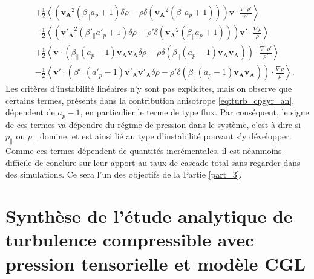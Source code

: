 \begin{equation}
{\begin{array}{lcl}
&& + \frac{1}{2} \left<  \left(  \boldsymbol{v_A}^2 \left(\beta_{\parallel}a_p+1\right) \delta \rho - \rho \delta \left(\boldsymbol{v_A}^2 \left(\beta_{\parallel}a_p+1\right)\right)  \right)\boldsymbol{v}\cdot  \frac{\nabla' \rho'}{\rho'} \right>\\
&&- \frac{1}{2} \left<\left(  \boldsymbol{v'_A}^2 \left(\beta'_{\parallel}a'_p+1\right) \delta \rho - \rho' \delta \left(\boldsymbol{v_A}^2 \left(\beta_{\parallel}a_p+1\right)\right)  \right) \boldsymbol{v'}\cdot  \frac{\nabla \rho}{\rho}  \right> \\
&& + \frac{1}{2} \left< \boldsymbol{v} \cdot \left(  \beta_{\parallel}\left(a_p-1\right) \boldsymbol{v_A} \boldsymbol{v_A} \delta \rho - \rho \delta \left(\beta_{\parallel}\left(a_p-1\right) \boldsymbol{v_A} \boldsymbol{v_A}\right)  \right)\cdot  \frac{\nabla' \rho'}{\rho'} \right>\\
&&-\frac{1}{2}\left< \boldsymbol{v'} \cdot \left( \beta'_{\parallel}\left(a'_p-1\right) \boldsymbol{v'_A} \boldsymbol{v'_A}  \delta \rho - \rho' \delta \left(\beta_{\parallel}\left(a_p-1\right) \boldsymbol{v_A} \boldsymbol{v_A} \right)\right) \cdot  \frac{\nabla \rho}{\rho} \right>.
\end{array}}
\end{equation}
Les critères d'instabilité linéaires n'y sont pas explicites, mais on observe que certains termes, présents dans la contribution anisotrope \eqref{eq:turb_cpgyr_an}, dépendent de $a_p-1$, en particulier le terme de type flux. Par conséquent, le signe de ces termes va dépendre du régime de pression dans le système, c'est-à-dire si $p_{\parallel}$ ou $p_{\perp}$ domine, et est ainsi lié au type d'instabilité pouvant s'y développer. Comme ces termes dépendent de quantités incrémentales, il est néanmoins difficile de conclure sur leur apport au taux de cascade total sans regarder dans des simulations. Ce sera l'un des objectifs de la Partie \ref{part_3}.

\newpage
\section{Synthèse de l'étude analytique de turbulence compressible avec pression tensorielle et modèle CGL}
\label{synt-21}

